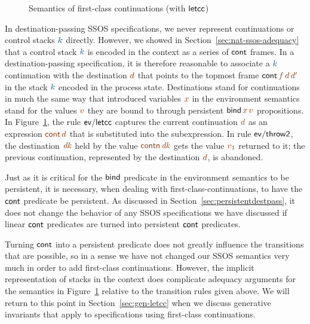 \begin{figure}
\caption{Semantics of first-class continuations (with ${\sf letcc}$)}
\label{fig:dest-letcc}
\end{figure}


In destination-passing SSOS specifications, we never represent
continuations or control stacks $\obj{k}$ directly. However, we showed
in Section~\ref{sec:nat-ssos-adequacy} that a control stack $\obj{k}$
is encoded in the context as a series of ${\sf cont}$ frames. In a
destination-passing specification, it is therefore reasonable to
associate a $\obj{k}$ continuation with the destination $\lf{d}$ that
points to the topmost frame ${\sf cont}\,\lf{f}\,\lf{d}\,\lf{d'}$ in
the stack $\obj{k}$ encoded in the process state. Destinations 
stand for continuations in much the same way that introduced
variables $\lf{x}$ in the environment semantics stand for the values
$\lf{v}$ they are bound to through persistent ${\sf
  bind}\,\lf{x}\,\lf{v}$ propositions. In Figure~\ref{fig:dest-letcc},
the rule ${\sf ev/letcc}$ captures the current continuation $\lf{d}$
as an expression $\lf{{\sf cont}\,d}$ that is substituted into the
subexpression. In rule ${\sf ev/throw2}$, the destination $\lf{\it
  dk}$ held by the value $\lf{{\sf contn}\,{\it dk}}$ gets the value
$\lf{v_1}$ returned to it; the previous continuation, represented by
the destination $\lf{d}$, is abandoned.

Just as it is critical for the ${\sf bind}$ predicate in the
environment semantics to be persistent, it is necessary, when dealing
with first-class-continuations, to have the ${\sf cont}$ predicate be
persistent. As discussed in Section~\ref{sec:persistentdestpass}, it
does not change the behavior of any SSOS specifications we have
discussed if linear ${\sf cont}$ predicates are turned into persistent
${\sf cont}$ predicates.

Turning ${\sf cont}$ into a persistent predicate does not greatly
influence the transitions that are possible, so in a sense we have not
changed our SSOS semantics very much in order to add first-class
continuations. However, the implicit representation of stacks in the
context does complicate adequacy arguments for the semantics in
Figure~\ref{fig:dest-letcc} relative to the transition rules given
above. We will return to this point in Section~\ref{sec:gen-letcc}
when we discuss generative invariants that apply to specifications using
first-class continuations.
